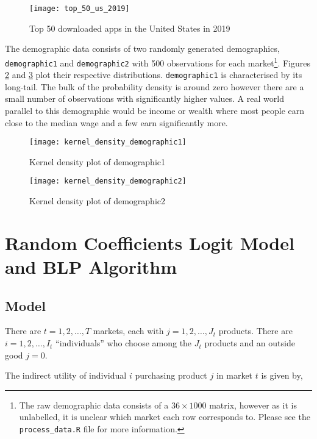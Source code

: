 \documentclass[parskip=half]{scrartcl}
\newcommand{\code}[1]{\texttt{#1}}
\begin{document}
\begin{figure}[ht]
	\centering
	\texttt{[image: top\_50\_us\_2019]}
	\caption{Top 50 downloaded apps in the United States in 2019}
	\label{fig:top_50_us_2019}
\end{figure}

The demographic data consists of two randomly generated demographics, \code{demographic1} and \code{demographic2} with 500 observations for each market\footnote{The raw demographic data consists of a \(36\times1000\) matrix, however as it is unlabelled, it is unclear which market each row corresponds to. Please see the \code{process\_data.R} file for more information.}. Figures \ref{fig:density_demographic_1} and \ref{fig:density_demographic_2} plot their respective distributions.
\code{demographic1} is characterised by its long-tail. The bulk of the probability density is around zero however there are a small number of observations with significantly higher values. A real world parallel to this demographic would be income or wealth where most people earn close to the median wage and a few earn significantly more.

\begin{figure}[ht]
	\centering
	\texttt{[image: kernel\_density\_demographic1]}
	\caption{Kernel density plot of demographic1}
	\label{fig:density_demographic_1}
\end{figure}

\begin{figure}[ht]
	\centering
	\texttt{[image: kernel\_density\_demographic2]}
	\caption{Kernel density plot of demographic2}
	\label{fig:density_demographic_2}
\end{figure}


\section{Random Coefficients Logit Model and BLP Algorithm}

\subsection{Model}

There are \(t = 1, 2, \dotsc, T\) markets, each with \(j = 1, 2, \dotsc, J_t\) products. There are \(i = 1, 2, \dotsc, I_t\) ``individuals'' who choose among the \(J_t\) products and an outside good \(j = 0\).

The indirect utility of individual \(i\) purchasing product \(j\) in market \(t\) is given by,
\end{document}
